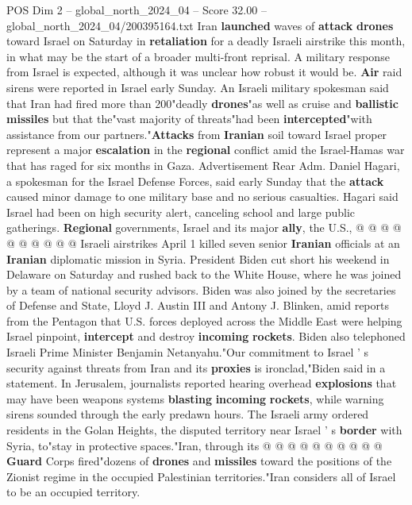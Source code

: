 \begin{textsample}{POS Dim 2 – global\_north\_2024\_04 – Score 32.00 – global\_north\_2024\_04/200395164.txt}  \label{ex:f2_pos_161}
Iran \textbf{launched} waves of \textbf{attack} \textbf{drones} toward Israel on Saturday in \textbf{retaliation} for a deadly Israeli airstrike this month, in what may be the start of a broader multi-front reprisal.
A military response from Israel is expected, although it was unclear how robust it would be. \textbf{Air} raid sirens were reported in Israel early Sunday.
An Israeli military spokesman said that Iran had fired more than 200"deadly \textbf{drones}"as well as cruise and \textbf{ballistic} \textbf{missiles} but that the"vast majority of threats"had been \textbf{intercepted}"with assistance from our partners."\textbf{Attacks} from \textbf{Iranian} soil toward Israel proper represent a major \textbf{escalation} in the \textbf{regional} conflict amid the Israel-Hamas war that has raged for six months in Gaza.
Advertisement Rear Adm.
Daniel Hagari, a spokesman for the Israel Defense Forces, said early Sunday that the \textbf{attack} caused minor damage to one military base and no serious casualties.
Hagari said Israel had been on high security alert, canceling school and large public gatherings. \textbf{Regional} governments, Israel and its major \textbf{ally}, the U.S., @ @ @ @ @ @ @ @ @ @ Israeli airstrikes April 1 killed seven senior \textbf{Iranian} officials at an \textbf{Iranian} diplomatic mission in Syria.
President Biden cut short his weekend in Delaware on Saturday and rushed back to the White House, where he was joined by a team of national security advisors.
Biden was also joined by the secretaries of Defense and State, Lloyd J.
Austin III and Antony J.
Blinken, amid reports from the Pentagon that U.S. forces deployed across the Middle East were helping Israel pinpoint, \textbf{intercept} and destroy \textbf{incoming} \textbf{rockets}.
Biden also telephoned Israeli Prime Minister Benjamin Netanyahu."Our commitment to Israel ' s security against threats from Iran and its \textbf{proxies} is ironclad,"Biden said in a statement.
In Jerusalem, journalists reported hearing overhead \textbf{explosions} that may have been weapons systems \textbf{blasting} \textbf{incoming} \textbf{rockets}, while warning sirens sounded through the early predawn hours.
The Israeli army ordered residents in the Golan Heights, the disputed territory near Israel ' s \textbf{border} with Syria, to"stay in protective spaces."Iran, through its @ @ @ @ @ @ @ @ @ @ \textbf{Guard} Corps fired"dozens of \textbf{drones} and \textbf{missiles} toward the positions of the Zionist regime in the occupied Palestinian territories."Iran considers all of Israel to be an occupied territory.

\end{textsample}
